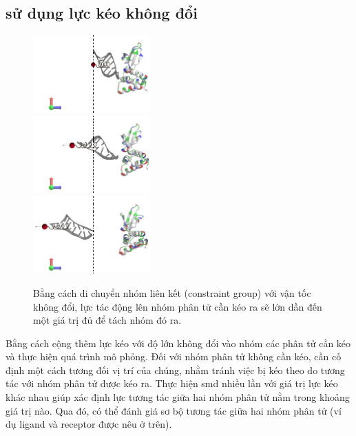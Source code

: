 \documentclass[12pt,a4paper,reqno, oneside]{book}
\begin{document}
	\subsection{ sử dụng lực kéo không đổi}
	\begin{figure}
	\vspace{-30pt}
	\begin{center}
	\includegraphics[width=0.4\textwidth,natwidth=610,natheight=642]{smd-1}\\
	\includegraphics[width=0.4\textwidth,natwidth=610,natheight=642]{smd-2}\\
	\includegraphics[width=0.4\textwidth,natwidth=610,natheight=642]{smd-3}
	\end{center}
	\vspace{-5pt}
	\caption{Bằng cách di chuyển nhóm liên kết (constraint group) với vận tốc không đổi, lực tác động lên nhóm phân tử cần kéo ra sẽ lớn dần đến một giá trị đủ để tách nhóm đó ra.}
	\label{fig:smd}
	\end{figure}
	
	Bằng cách cộng thêm lực kéo với độ lớn không đổi vào nhóm các phân tử cần kéo và thực hiện quá trình mô phỏng. Đối với nhóm phân tử không cần kéo, cần cố định một cách tương đối vị trí của chúng, nhằm tránh việc bị kéo theo do tương tác với nhóm phân tử được kéo ra. Thực hiện \gls{smd} nhiều lần với giá trị lực kéo khác nhau giúp xác định lực tương tác giữa hai nhóm phân tử nằm trong khoảng giá trị nào. Qua đó, có thể đánh giá sơ bộ tương tác giữa hai nhóm phân tử (ví dụ \gls{ligand} và \gls{receptor} được nêu ở trên).
\end{document}
